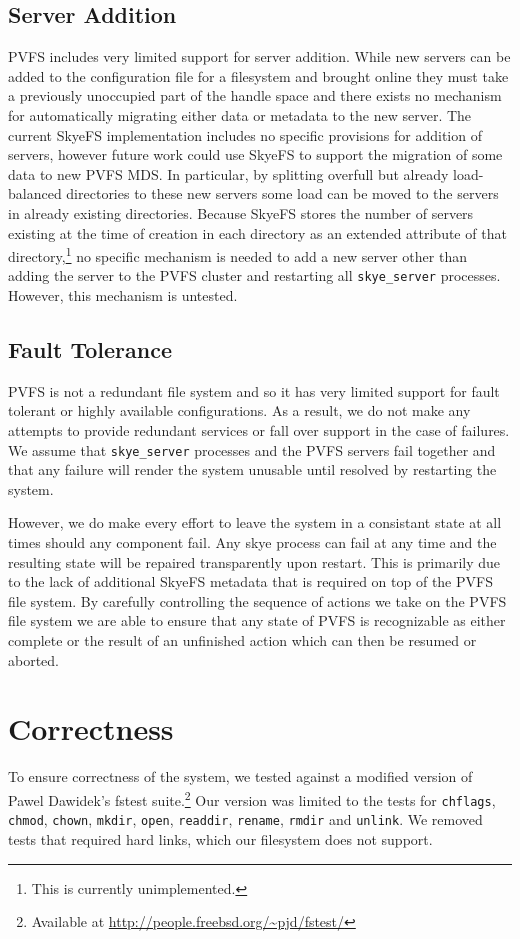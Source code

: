 \documentclass[twocolumn,letterpaper]{article}
\newcommand{\code}[1]{\texttt{#1}}
\begin{document}
\subsection{Server Addition}
PVFS includes very limited support for server addition.  While new servers can
be added to the configuration file for a filesystem and brought online they must
take a previously unoccupied part of the handle space and there exists no
mechanism for automatically migrating either data or metadata to the new server.
The current SkyeFS implementation includes no specific provisions for addition
of servers, however future work could use SkyeFS to support the migration of
some data to new PVFS MDS.  In particular, by splitting overfull but already
load-balanced directories to these new servers some load can be moved to the
servers in already existing directories.  Because SkyeFS stores the number of
servers existing at the time of creation in each directory as an extended
attribute of that directory,\footnote{This is currently unimplemented.} no
specific mechanism is needed to add a new server other than adding the server
to the PVFS cluster and restarting all \code{skye\_\-server} processes.  However,
this mechanism is untested.

\subsection{Fault Tolerance}
PVFS is not a redundant file system and so it has very limited support for fault
tolerant or highly available configurations.  As a result, we do not make any
attempts to provide redundant services or fall over support in the case of
failures.  We assume that \code{skye\_\-server} processes and the PVFS servers fail
together and that any failure will render the system unusable until resolved by
restarting the system.

However, we do make every effort to leave the system in a consistant state at
all times should any component fail.  Any skye process can fail at any time
and the resulting state will be repaired transparently upon restart.  This is
primarily due to the lack of additional SkyeFS metadata that is required on
top of the PVFS file system.  By carefully controlling the sequence of actions
we take on the PVFS file system we are able to ensure that any state of PVFS
is recognizable as either complete or the result of an unfinished action which
can then be resumed or aborted.

\section{Correctness}
To ensure correctness of the system, we tested against a modified version of
Pawel Dawidek's fstest suite.\footnote{Available at
\url{http://people.freebsd.org/~pjd/fstest/}}  Our version was limited to the
tests for \code{chflags}, \code{chmod}, \code{chown}, \code{mkdir},
\code{open}, \code{readdir}, \code{rename}, \code{rmdir} and \code{unlink}.
We removed tests that required hard links, which our filesystem does not
support.
\end{document}
